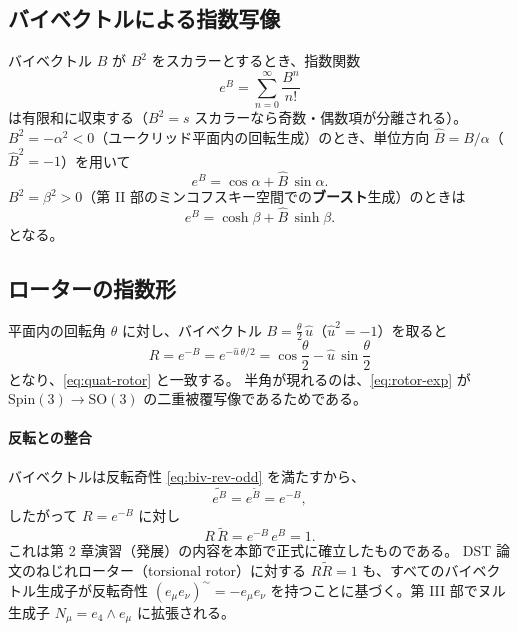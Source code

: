 \documentclass[dvipdfmx,a4paper,oneside]{jsbook}
\numberwithin{equation}{chapter}
\begin{document}
\subsection{バイベクトルによる指数写像}

バイベクトル \(B\) が \(B^2\) をスカラーとするとき、指数関数
\begin{equation}
  e^{B} = \sum_{n=0}^{\infty} \frac{B^n}{n!}
  \label{eq:exp-biv}
\end{equation}
は有限和に収束する（\(B^2 = s\) スカラーなら奇数・偶数項が分離される）。
\(B^2 = -\alpha^2 < 0\)（ユークリッド平面内の回転生成）のとき、単位方向 \(\hat{B} = B/\alpha\)（\(\hat{B}^2 = -1\)）を用いて
\begin{equation}
  e^{B} = \cos\alpha + \hat{B}\,\sin\alpha.
  \label{eq:exp-rotation}
\end{equation}
\(B^2 = \beta^2 > 0\)（第 II 部のミンコフスキー空間での\textbf{ブースト}生成）のときは
\begin{equation}
  e^{B} = \cosh\beta + \hat{B}\,\sinh\beta.
  \label{eq:exp-boost}
\end{equation}
となる。

\subsection{ローターの指数形}

平面内の回転角 \(\theta\) に対し、バイベクトル \(B = \tfrac{\theta}{2}\,\hat{u}\)（\(\hat{u}^2 = -1\)）を取ると
\begin{equation}
  R = e^{-B} = e^{-\hat{u}\,\theta/2}
  = \cos\frac{\theta}{2} - \hat{u}\,\sin\frac{\theta}{2}
  \label{eq:rotor-exp}
\end{equation}
となり、\eqref{eq:quat-rotor} と一致する。
半角が現れるのは、\eqref{eq:rotor-exp} が \(\mathrm{Spin}(3) \to \mathrm{SO}(3)\) の二重被覆写像であるためである。

\paragraph{反転との整合}
バイベクトルは反転奇性 \eqref{eq:biv-rev-odd} を満たすから、
\begin{equation}
  \widetilde{e^{B}} = e^{\widetilde{B}} = e^{-B},
  \label{eq:exp-reversion}
\end{equation}
したがって \(R = e^{-B}\) に対し
\begin{equation}
  R\,\widetilde{R} = e^{-B}\,e^{B} = 1.
  \label{eq:rotor-unitarity-proof}
\end{equation}
これは第 2 章演習（発展）の内容を本節で正式に確立したものである。
DST 論文のねじれローター（torsional rotor）に対する \(R\widetilde{R}=1\) も、すべてのバイベクトル生成子が反転奇性 \((e_\mu e_\nu)^{\sim} = -e_\mu e_\nu\) を持つことに基づく。第 III 部でヌル生成子 \(N_\mu = e_4 \wedge e_\mu\) に拡張される。
\end{document}
